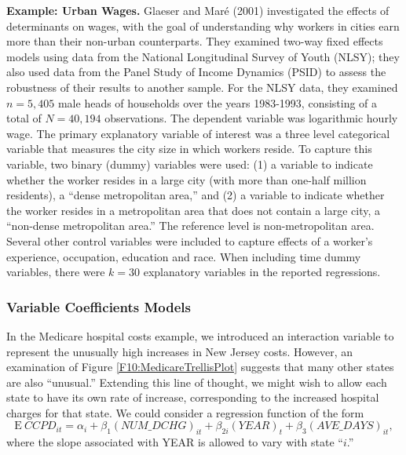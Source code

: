 \textbf{Example: Urban Wages.} Glaeser and Mar\'{e} (2001)
investigated the effects of determinants on wages, with the goal of
understanding why workers in cities earn more than their non-urban
counterparts. They examined two-way fixed effects models using data
from the National Longitudinal Survey of Youth (NLSY); they also
used data from the Panel Study of Income Dynamics (PSID) to assess
the robustness of their results to another sample. For the NLSY
data, they examined $n = 5,405$ male heads of households over the
years 1983-1993, consisting of a total of $N = 40,194$ observations.
The dependent variable was logarithmic hourly wage. The primary
explanatory variable of interest was a three level categorical
variable that measures the city size in which workers reside. To
capture this variable, two binary (dummy) variables were used: (1) a
variable to indicate whether the worker resides in a large city
(with more than one-half million residents), a ``dense metropolitan
area,'' and (2) a variable to indicate whether the worker resides in
a metropolitan area that does not contain a large city, a
``non-dense metropolitan area.'' The reference level is
non-metropolitan area. Several other control variables were included
to capture effects of a worker's experience, occupation, education
and race. When including time dummy variables, there were $k = 30$
explanatory variables in the reported regressions.

\linejed

\subsubsection*{Variable Coefficients Models}

In the Medicare hospital costs example, we introduced an interaction
variable to represent the unusually high increases in New Jersey
costs. However, an examination of Figure
\ref{F10:MedicareTrellisPlot} suggests that many other states are
also ``unusual.'' Extending this line of thought, we might wish to
allow each state to have its own rate of increase, corresponding to
the increased hospital charges for that state. We could consider a
regression function of the form
\begin{equation}\label{E10:MedicareVSlope}
\mathrm{E}~CCPD_{it} = \alpha_i + \beta_1 (NUM\_DCHG)_{it} +
\beta_{2i} (YEAR)_{t} + \beta_3 (AVE\_DAYS)_{it} ,
\end{equation}
where the slope associated with YEAR is allowed to vary with state
``$i$.''


